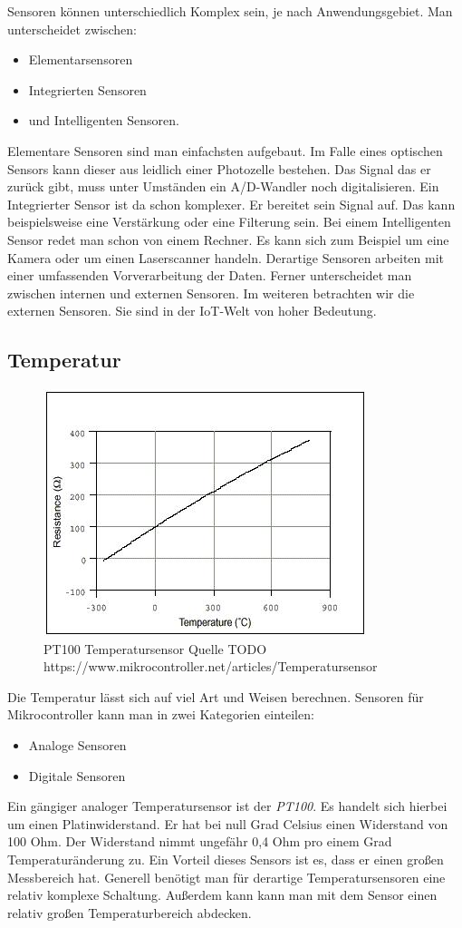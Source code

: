Sensoren können unterschiedlich Komplex sein, je nach Anwendungsgebiet. Man unterscheidet zwischen:
\begin{itemize}
\item Elementarsensoren
\item Integrierten Sensoren
\item und Intelligenten Sensoren.
\end{itemize}

Elementare Sensoren sind man einfachsten aufgebaut. Im Falle eines optischen Sensors kann dieser aus leidlich einer Photozelle bestehen. Das Signal das er zurück gibt, muss unter Umständen ein A/D-Wandler noch digitalisieren. 
Ein Integrierter Sensor ist da schon komplexer. Er bereitet sein Signal auf. Das kann beispielsweise eine Verstärkung oder eine Filterung sein. Bei einem Intelligenten Sensor redet man schon von einem Rechner. Es kann sich zum Beispiel um eine Kamera oder um einen Laserscanner handeln. Derartige Sensoren arbeiten mit einer umfassenden Vorverarbeitung der Daten. 
Ferner unterscheidet man zwischen internen und externen Sensoren. Im weiteren betrachten wir die externen Sensoren. Sie sind in der IoT-Welt von hoher Bedeutung.
\subsection{Temperatur}
\begin{figure}
\includegraphics[scale=1]{bilder/pt100} 
\caption{PT100 Temperatursensor Quelle TODO https://www.mikrocontroller.net/articles/Temperatursensor }
\label{PT100}
\end{figure}
Die Temperatur lässt sich auf viel Art und Weisen berechnen. Sensoren für Mikrocontroller kann man in zwei Kategorien einteilen:
\begin{itemize}
\item Analoge Sensoren
\item Digitale Sensoren
\end{itemize}
Ein gängiger analoger Temperatursensor ist der \textit{PT100}. Es handelt sich hierbei um einen Platinwiderstand. Er hat bei null Grad Celsius einen Widerstand von 100 Ohm. Der Widerstand nimmt ungefähr 0,4 Ohm pro einem Grad Temperaturänderung zu. Ein Vorteil dieses Sensors ist es, dass er einen großen Messbereich hat. Generell benötigt man für derartige Temperatursensoren eine relativ komplexe Schaltung. Außerdem kann kann man mit dem Sensor einen relativ großen Temperaturbereich abdecken.

